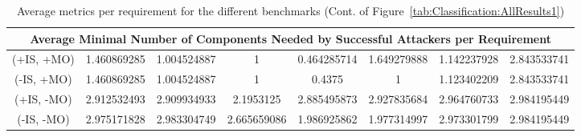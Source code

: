 \begin{landscape}
\begin{table}[!t]
\begin{tabular}{|c|c|c|c|c|c|c|c|}
			\multicolumn{8}{|c|}{Average Minimal Number of Components Needed by Successful Attackers per Requirement}          \\ 
			\hline
			(+IS, +MO) & 1.460869285  & 1.004524887 & 1           & 0.464285714 & 1.649279888 & 1.142237928 & 2.843533741      \\
			(-IS, +MO) & 1.460869285  & 1.004524887 & 1           & 0.4375      & 1           & 1.123402209 & 2.843533741      \\
			(+IS, -MO) & 2.912532493  & 2.909934933 & 2.1953125   & 2.885495873 & 2.927835684 & 2.964760733 & 2.984195449      \\
			(-IS, -MO) & 2.975171828  & 2.983304749 & 2.665659086 & 1.986925862 & 1.977314997 & 2.973301799 & 2.984195449      \\ \hline
	\end{tabular}
		\caption{Average metrics per requirement for the different benchmarks (Cont. of Figure~\ref{tab:Classification:AllResults1})}
		\label{tab:Classification:AllResults2}
		\end{table}	
\end{landscape} 
